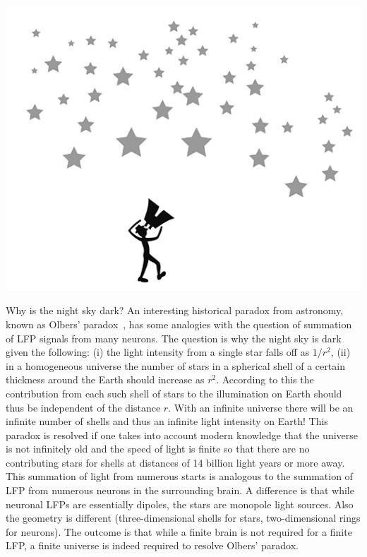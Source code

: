 \subsection{}
%
\begin{center}
\includegraphics{Figures/LFP/LFP-night-sky-w90-r150}
\end{center}
\vspace*{6pt}
%
Why is the night sky dark? An interesting historical paradox from astronomy, known as Olbers' paradox~\cite{Harrison1989}, has some analogies with the question of summation of LFP signals from many neurons. The question is why the night sky is dark given the following:
(i) the light intensity from a single star falls off as $1/r^2$, (ii) in a homogeneous universe the number of stars in a spherical shell of a certain thickness around the Earth should increase as $r^2$. According to this the contribution from each such shell of stars to the illumination on Earth should thus be independent of the distance $r$. With an infinite universe there will be an infinite number of shells and thus an infinite light intensity on Earth! This paradox is resolved if one takes into account modern knowledge that the universe is not infinitely old and the speed of light is finite so that there are no contributing stars for shells at distances of 14 billion light years or more away. This summation of light from numerous starts is analogous to the summation of LFP from numerous neurons in the surrounding brain. A difference is that while neuronal LFPs are essentially dipoles, the stars are monopole light sources. Also the geometry is different (three-dimensional shells for stars, two-dimensional rings for neurons). The outcome is that while a finite brain is not required for a finite LFP, a finite universe is indeed required to resolve Olbers' paradox.


